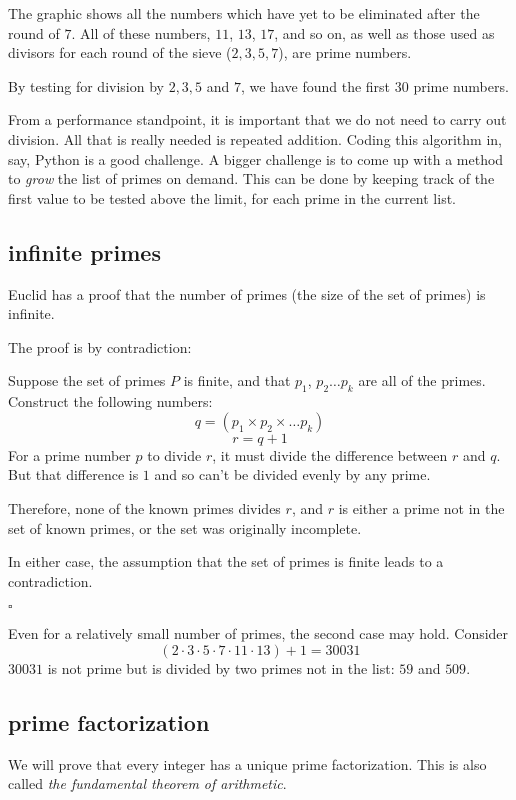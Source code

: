 \documentclass[11pt, oneside]{article}
\begin{document}
The graphic shows all the numbers which have yet to be eliminated after the round of $7$.   All of these numbers, $11$, $13$, $17$, and so on, as well as those used as divisors for each round of the sieve ($2, 3, 5, 7$), are prime numbers.

By testing for division by $2, 3, 5$ and $7$, we have found the first $30$ prime numbers.

From a performance standpoint, it is important that we do not need to carry out division.  All that is really needed is repeated addition.  Coding this algorithm in, say, Python is a good challenge.  A bigger challenge is to come up with a method to \emph{grow} the list of primes on demand.  This can be done by keeping track of the first value to be tested above the limit, for each prime in the current list.

\subsection*{infinite primes}

Euclid has a proof that the number of primes (the size of the set of primes) is infinite.

The proof is by contradiction:

Suppose the set of primes $P$ is finite, and that $p_1$, $p_2 \dots p_k$ are all of the primes.  Construct the following numbers:
\[ q = (p_1 \times p_2 \times \dots p_k)  \]
\[ r = q + 1 \]
For a prime number $p$ to divide $r$, it must divide the difference between $r$ and $q$.  But that difference is $1$ and so can't be divided evenly by any prime.

Therefore, none of the known primes divides $r$, and $r$ is either a prime not in the set of known primes, or the set was originally incomplete.

In either case, the assumption that the set of primes is finite leads to a contradiction.

$\square$

Even for a relatively small number of primes, the second case may hold.  Consider
\[ (2 \cdot 3 \cdot 5 \cdot 7 \cdot 11 \cdot 13) + 1 = 30031 \]
$30031$ is not prime but is divided by two primes not in the list:  $59$ and $509$.

\subsection*{prime factorization}

We will prove that every integer has a unique prime factorization.  This is also called \emph{the fundamental theorem of arithmetic}.
\end{document}
